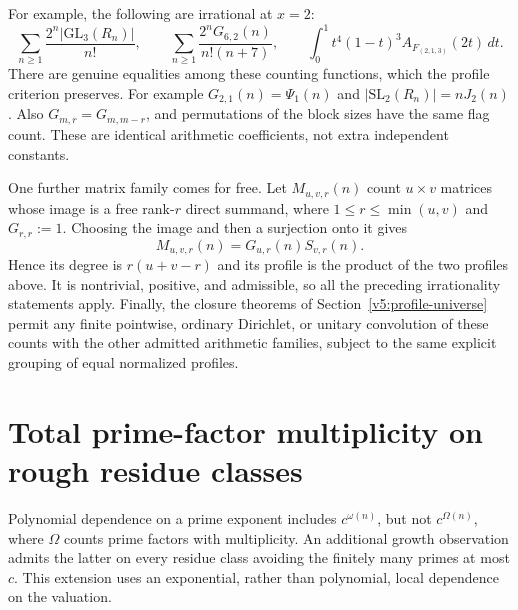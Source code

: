 For example, the following are irrational at $x=2$:
\[
 \sum_{n\ge1}\frac{2^n|\mathrm{GL}_3(R_n)|}{n!},\qquad
 \sum_{n\ge1}\frac{2^nG_{6,2}(n)}{n!(n+7)},\qquad
 \int_0^1 t^4(1-t)^3 A_{F_{(2,1,3)}}(2t)\,dt.
\]
There are genuine equalities among these counting functions, which the
profile criterion preserves.  For example
$G_{2,1}(n)=\Psi_1(n)$ and
$|\mathrm{SL}_2(R_n)|=nJ_2(n)$.
Also $G_{m,r}=G_{m,m-r}$, and permutations of the block sizes have the
same flag count.  These are identical arithmetic coefficients, not extra
independent constants.

One further matrix family comes for free.  Let $M_{u,v,r}(n)$ count
$u\times v$ matrices whose image is a free rank-$r$ direct summand,
where $1\le r\le\min(u,v)$ and $G_{r,r}:=1$.
Choosing the image and then a surjection onto it gives
\[
 M_{u,v,r}(n)=G_{u,r}(n)S_{v,r}(n).
\]
Hence its degree is $r(u+v-r)$ and its profile is the product of the
two profiles above.  It is nontrivial, positive, and admissible, so all
the preceding irrationality statements apply.  Finally, the closure theorems of Section~\ref{v5:profile-universe} permit any finite pointwise, ordinary Dirichlet, or unitary
convolution of these counts with the other admitted arithmetic families,
subject to the same explicit grouping of equal normalized profiles.


\section{Total prime-factor multiplicity on rough residue classes}
\label{sec:v5-rough-omega}

Polynomial dependence on a prime exponent includes $c^{\omega(n)}$,
but not $c^{\Omega(n)}$, where $\Omega$ counts prime factors with
multiplicity.  An additional growth observation admits the latter
on every residue class avoiding the finitely many primes at most $c$.
This extension uses an exponential, rather than polynomial, local
dependence on the valuation.

